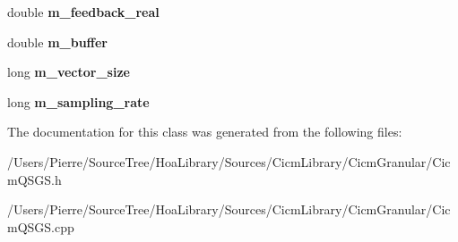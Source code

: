 \begin{DoxyCompactItemize}
\item 
\hypertarget{class_cicm_qsgs_a8cd47eeb8033a5050b2889a52ccb0992}{double {\bfseries m\-\_\-feedback\-\_\-real}}\label{class_cicm_qsgs_a8cd47eeb8033a5050b2889a52ccb0992}

\item 
\hypertarget{class_cicm_qsgs_a8ca54d3e735b021bf2ba21d2cbce6acf}{double {\bfseries m\-\_\-buffer}}\label{class_cicm_qsgs_a8ca54d3e735b021bf2ba21d2cbce6acf}

\item 
\hypertarget{class_cicm_qsgs_a9a2632cfcd38e0339650a54b4760f247}{long {\bfseries m\-\_\-vector\-\_\-size}}\label{class_cicm_qsgs_a9a2632cfcd38e0339650a54b4760f247}

\item 
\hypertarget{class_cicm_qsgs_adb1658bf6e8b1e32e98144829d2362d0}{long {\bfseries m\-\_\-sampling\-\_\-rate}}\label{class_cicm_qsgs_adb1658bf6e8b1e32e98144829d2362d0}

\end{DoxyCompactItemize}


The documentation for this class was generated from the following files\-:\begin{DoxyCompactItemize}
\item 
/\-Users/\-Pierre/\-Source\-Tree/\-Hoa\-Library/\-Sources/\-Cicm\-Library/\-Cicm\-Granular/Cicm\-Q\-S\-G\-S.\-h\item 
/\-Users/\-Pierre/\-Source\-Tree/\-Hoa\-Library/\-Sources/\-Cicm\-Library/\-Cicm\-Granular/Cicm\-Q\-S\-G\-S.\-cpp\end{DoxyCompactItemize}

